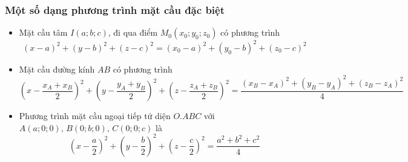 \subsubsection{Một số dạng phương trình mặt cầu đặc biệt}
\begin{itemize}
	\item Mặt cầu tâm $I(a;b;c)$, đi qua điểm $M_0(x_0;y_0;z_0)$ có phương trình
	$$(x-a)^2+(y-b)^2+(z-c)^2=(x_0-a)^2+(y_0-b)^2+(z_0-c)^2$$
	\item Mặt cầu đường kính $AB$ có phương trình
	$${\left(x-\dfrac{x_A+x_B}{2}\right)\!}^2+{\left(y-\dfrac{y_A+y_B}{2}\right)\!}^2+{\left(z-\dfrac{z_A+z_B}{2}\right)\!}^2=\dfrac{(x_B-x_A)^2+(y_B-y_A)^2+(z_B-z_A)^2}{4}$$
	\item Phương trình mặt cầu ngoại tiếp tứ diện $O.ABC$ với $A(a;0;0),\,B(0;b;0),\,C(0;0;c)$ là  \vspace{-0.1cm} $$\left(x-\dfrac{a}{2}\right)^2+\left(y-\dfrac{b}{2}\right)^2+\left(z-\dfrac{c}{2}\right)^2=\dfrac{a^2+b^2+c^2}{4}$$  \vspace{-0.5cm}
\end{itemize}
